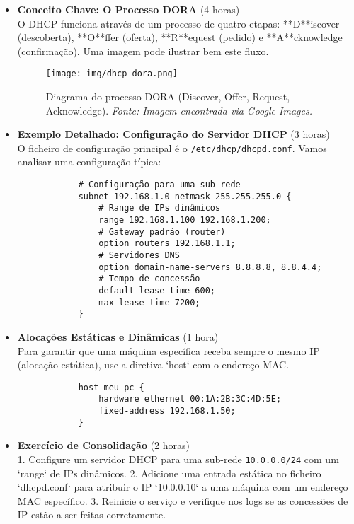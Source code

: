 \documentclass[10pt,a4paper]{article}
\begin{document}
	\begin{itemize}
		\item \textbf{Conceito Chave: O Processo DORA} (4 horas) \\
		O DHCP funciona através de um processo de quatro etapas: **D**iscover (descoberta), **O**ffer (oferta), **R**equest (pedido) e **A**cknowledge (confirmação). Uma imagem pode ilustrar bem este fluxo.
		
		\begin{figure}[h]
			\centering
			\texttt{[image: img/dhcp\_dora.png]}
			\caption{Diagrama do processo DORA (Discover, Offer, Request, Acknowledge). \textit{Fonte: Imagem encontrada via Google Images.}}
			\label{fig:dhcp_dora}
		\end{figure}
		
		\item \textbf{Exemplo Detalhado: Configuração do Servidor DHCP} (3 horas) \\
		O ficheiro de configuração principal é o \texttt{/etc/dhcp/dhcpd.conf}. Vamos analisar uma configuração típica:
		\begin{verbatim}
			# Configuração para uma sub-rede
			subnet 192.168.1.0 netmask 255.255.255.0 {
				# Range de IPs dinâmicos
				range 192.168.1.100 192.168.1.200;
				# Gateway padrão (router)
				option routers 192.168.1.1;
				# Servidores DNS
				option domain-name-servers 8.8.8.8, 8.8.4.4;
				# Tempo de concessão
				default-lease-time 600;
				max-lease-time 7200;
			}
		\end{verbatim}
		
		\item \textbf{Alocações Estáticas e Dinâmicas} (1 hora) \\
		Para garantir que uma máquina específica receba sempre o mesmo IP (alocação estática), use a diretiva `host` com o endereço MAC.
		\begin{verbatim}
			host meu-pc {
				hardware ethernet 00:1A:2B:3C:4D:5E;
				fixed-address 192.168.1.50;
			}
		\end{verbatim}
		
		\item \textbf{Exercício de Consolidação} (2 horas) \\
		1. Configure um servidor DHCP para uma sub-rede \texttt{10.0.0.0/24} com um `range` de IPs dinâmicos.
		2. Adicione uma entrada estática no ficheiro `dhcpd.conf` para atribuir o IP `10.0.0.10` a uma máquina com um endereço MAC específico.
		3. Reinicie o serviço e verifique nos logs se as concessões de IP estão a ser feitas corretamente.
	\end{itemize}
	
\end{document}
